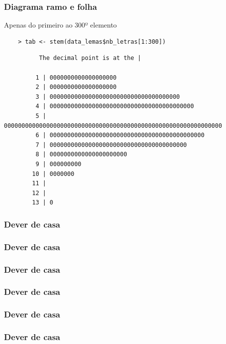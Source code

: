 \documentclass[14pt]{beamer}
\begin{document}
\begin{frame}[t,fragile=singleslide]
\frametitle{Diagrama ramo e folha}
	Apenas do primeiro ao 300º elemento
	\begin{lstlisting}
	> tab <- stem(data_lemas$nb_letras[1:300])
	\end{lstlisting}
	\vspace{2.0cm}
	
	\begin{addmargin}[2cm]{0em}
		\normalsize 
		\begin{verbatim}
		  The decimal point is at the |
		
		 1 | 0000000000000000000
		 2 | 0000000000000000000
		 3 | 0000000000000000000000000000000000000
		 4 | 00000000000000000000000000000000000000000
		 5 | 00000000000000000000000000000000000000000000000000000000000000
		 6 | 00000000000000000000000000000000000000000000
		 7 | 000000000000000000000000000000000000000
		 8 | 0000000000000000000000
		 9 | 000000000
		10 | 0000000
		11 | 
		12 | 
		13 | 0
		\end{verbatim}
	\end{addmargin}

\end{frame}
\begin{frame}[t,fragile=singleslide]
\frametitle{Dever de casa}
\end{frame}
\begin{frame}[t,fragile=singleslide]
\frametitle{Dever de casa}
\end{frame}
\begin{frame}[t,fragile=singleslide]
\frametitle{Dever de casa}
\end{frame}
\begin{frame}[t,fragile=singleslide]
\frametitle{Dever de casa}
\end{frame}
\begin{frame}[t,fragile=singleslide]
\frametitle{Dever de casa}
\end{frame}
\begin{frame}[t,fragile=singleslide]
\frametitle{Dever de casa}
\end{frame}
\end{document}
